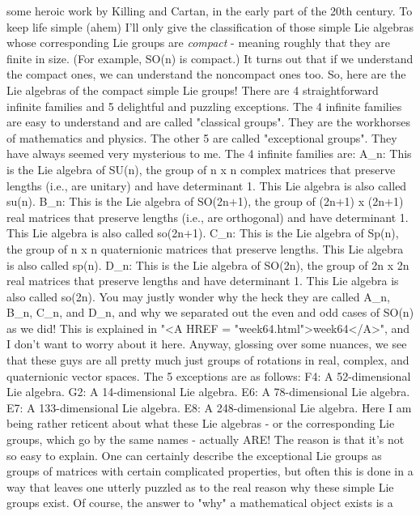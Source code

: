 some heroic work by Killing and Cartan, in the early part of the 20th
century.  To keep life simple (ahem) I'll only give the classification
of those simple Lie algebras whose corresponding Lie groups are
\emph{compact} - meaning roughly that they are finite in size.  (For
example, SO(n) is compact.)  It turns out that if we understand the
compact ones, we can understand the noncompact ones too.
So, here are the Lie algebras of the compact simple Lie groups!  There are
4 straightforward infinite families and 5 delightful and puzzling
exceptions.  The 4 infinite families are easy to understand and are
called "classical groups".  They are the workhorses of mathematics and
physics.  The other 5 are called "exceptional groups".  They have
always seemed very mysterious to me.  
The 4 infinite families are:
A_n: This is the Lie algebra of SU(n), the group of n x n complex
matrices that preserve lengths (i.e., are unitary) and have
determinant 1.   This Lie algebra is also called su(n).  
B_n: This is the Lie algebra of SO(2n+1), the group of (2n+1) x (2n+1)
real matrices that preserve lengths (i.e., are orthogonal) and have
determinant 1.  This Lie algebra is also called so(2n+1).
C_n: This is the Lie algebra of Sp(n), the group of n x n quaternionic
matrices that preserve lengths.  This Lie algebra is also called sp(n).
D_n: This is the Lie algebra of SO(2n), the group of 2n x 2n real matrices
that preserve lengths and have determinant 1.  This Lie algebra is also
called so(2n).
You may justly wonder why the heck they are called A_n, B_n, C_n, and
D_n, and why we separated out the even and odd cases of SO(n) as we
did!  This is explained in "<A HREF = "week64.html">week64</A>", and I don't 
want to worry about
it here.  Anyway, glossing over some nuances, we see that these guys
are all pretty much just groups of rotations in real, complex, and
quaternionic vector spaces.  
The 5 exceptions are as follows:
F4: A 52-dimensional Lie algebra.  
G2: A 14-dimensional Lie algebra. 
E6: A 78-dimensional Lie algebra.  
E7: A 133-dimensional Lie algebra.  
E8: A 248-dimensional Lie algebra.
Here I am being rather reticent about what these Lie algebras - or
the corresponding Lie groups, which go by the same names - actually
ARE!  The reason is that it's not so easy to explain.  One can
certainly describe the exceptional Lie groups as groups of matrices
with certain complicated properties, but often this is done in a way
that leaves one utterly puzzled as to the real reason why these
simple Lie groups exist.
Of course, the answer to "why" a mathematical object exists is a
